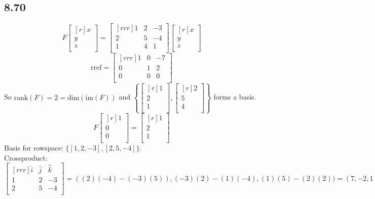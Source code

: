 \documentclass{report}
\begin{document}
\subsection{8.70}
\[ F\begin{bmatrix}[r]x\\y\\z\\\end{bmatrix}=\begin{bmatrix}[rrr]1&2&-3\\2&5&-4\\1&4&1\\\end{bmatrix}\begin{bmatrix}[r]x\\y\\z\\\end{bmatrix} \]
\[ \mathrm{rref}=\begin{bmatrix}[rrr]1&0&-7\\0&1&2\\0&0&0\\\end{bmatrix} \]
So $\mathrm{rank}(F)=2=\mathrm{dim}(\mathrm{im}(F))$ and $\left \{\begin{bmatrix}[r]1\\2\\1\\\end{bmatrix},\begin{bmatrix}[r]2\\5\\4\\\end{bmatrix}\right\}$ forms a basis.\\
\[ F\begin{bmatrix}[r]1\\0\\0\\\end{bmatrix}=\begin{bmatrix}[r]1\\2\\1\\\end{bmatrix} \]
Basis for rowspace: $\{[1,2,-3],[2,5,-4]\}$.\\
Crossproduct:
\[ \begin{bmatrix}[rrr]\hat{i} & \hat{j} & \hat{k}\\1&2&-3\\2&5&-4\\\end{bmatrix}=((2)(-4)-(-3)(5)),(-3)(2)-(1)(-4), (1)(5)-(2)(2)) = (7,-2,1) \]
\end{document}
